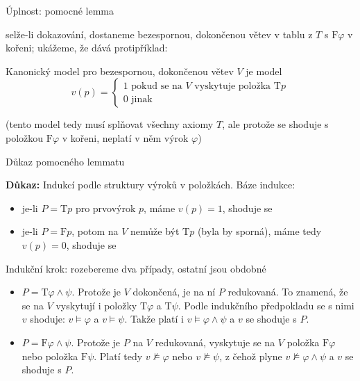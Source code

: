 \documentclass{beamer}
\begin{document}
\begin{frame}{Úplnost: pomocné lemma}

    selže-li dokazování, dostaneme \alert{bezespornou, dokončenou} větev v tablu z $T$ s $\mathrm{F}\varphi$ v kořeni; ukážeme, že dává protipříklad:

    \alert{Kanonický model} pro bezespornou, dokončenou větev $V$ je model
    $$
    v(p)=\begin{cases}
        1 \text{ pokud se na $V$ vyskytuje položka $\mathrm{T}p$}\\
        0 \text{ jinak}
    \end{cases}
    $$  
    
    \medskip


    \bigskip
    
    (tento model tedy musí splňovat všechny axiomy $T$, ale protože se shoduje s položkou $\mathrm{F}\varphi$ v kořeni, neplatí v něm výrok $\varphi$)

\end{frame}


\begin{frame}{Důkaz pomocného lemmatu}

    \textbf{Důkaz:}
    Indukcí podle struktury výroků v položkách. \alert{Báze indukce:} 
    \begin{itemize}
        \item je-li \alert{$P=\mathrm{T}p$} pro prvovýrok $p$, máme $v(p)=1$, shoduje se
        \item je-li \alert{$P=\mathrm{F}p$}, potom na $V$ nemůže být $\mathrm{T}p$ (byla by sporná), máme tedy $v(p)=0$, shoduje se
    \end{itemize}

    \alert{Indukční krok:} rozebereme dva případy, ostatní jsou obdobné

    \begin{itemize}
        \item \alert{$P=\mathrm{T}\varphi\land\psi$}. Protože je $V$ dokončená, je na ní $P$ redukovaná. To znamená, že se na $V$ vyskytují i položky $\mathrm{T}\varphi$ a $\mathrm{T}\psi$. Podle indukčního předpokladu se s nimi $v$ shoduje: $v\models\varphi$ a $v\models\psi$. Takže platí i $v\models\varphi\land\psi$ a $v$ se shoduje s $P$.
    
        \item \alert{$P=\mathrm{F}\varphi\land\psi$}. Protože je $P$ na $V$ redukovaná, vyskytuje se na $V$ položka $\mathrm{F}\varphi$ nebo položka $\mathrm{F}\psi$. Platí tedy $v\not\models\varphi$ nebo $v\not\models\psi$, z čehož plyne $v\not\models\varphi\land\psi$ a $v$ se shoduje s $P$.\hfill\qedsymbol
    \end{itemize}

\end{frame}
\end{document}
